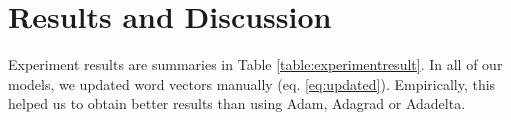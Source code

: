\hypertarget{chap:result}{\chapter{Results and Discussion}}\label{result-discuss}
Experiment results are summaries in Table \ref{table:experimentresult}. In all of our models, we updated word vectors manually (eq. \ref{eq:updated}).
Empirically, this helped us to obtain better results than using Adam, Adagrad or Adadelta.


